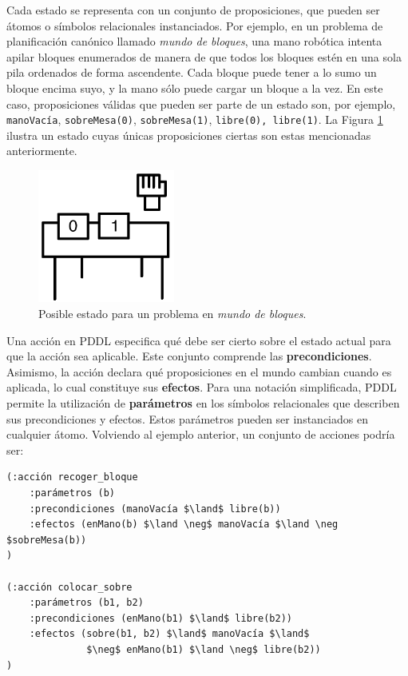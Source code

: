 Cada estado se representa con un conjunto de proposiciones, que pueden ser
átomos o símbolos relacionales instanciados. Por ejemplo, en un problema de
planificación canónico llamado \textit{mundo de bloques}, una mano
robótica intenta apilar bloques enumerados de manera de que todos los bloques
estén en una sola pila ordenados de forma ascendente. Cada bloque puede tener a
lo sumo un bloque encima suyo, y la mano sólo puede cargar un bloque a la vez.
En este caso, proposiciones válidas que pueden ser parte de un estado son,
por ejemplo,
\texttt{manoVacía}, \texttt{sobreMesa(0)}, \texttt{sobreMesa(1)}, \texttt{libre(0),
\texttt{libre(1)}}.
La Figura \ref{blocksworld_inicial} ilustra un estado cuyas únicas
proposiciones ciertas son estas mencionadas anteriormente.
\begin{figure}[h!]
\centering
\includegraphics[width=0.4\textwidth]{figuras/blocksworld_inicial.png}
\caption{Posible estado para un problema en \textit{mundo de bloques}.}
\label{blocksworld_inicial}
\end{figure}

Una acción en PDDL especifica qué debe ser cierto sobre el estado actual para
que la acción sea aplicable. 
Este conjunto comprende las \textbf{precondiciones}. Asimismo,
la acción declara qué proposiciones en el mundo cambian cuando es aplicada,
lo cual constituye sus \textbf{efectos}. Para una notación
simplificada, PDDL permite la utilización de \textbf{parámetros} en los
símbolos relacionales que describen sus precondiciones y efectos. Estos
parámetros pueden ser instanciados en cualquier átomo. Volviendo al
ejemplo anterior, un conjunto de acciones podría ser:
\begin{Verbatim}[commandchars=\\\{\},
codes={\catcode`$=3\catcode`^=7}]
(:acción recoger_bloque
    :parámetros (b)
    :precondiciones (manoVacía $\land$ libre(b))
    :efectos (enMano(b) $\land \neg$ manoVacía $\land \neg $sobreMesa(b))
)

(:acción colocar_sobre
    :parámetros (b1, b2)
    :precondiciones (enMano(b1) $\land$ libre(b2))
    :efectos (sobre(b1, b2) $\land$ manoVacía $\land$
              $\neg$ enMano(b1) $\land \neg$ libre(b2))
)
\end{Verbatim}

